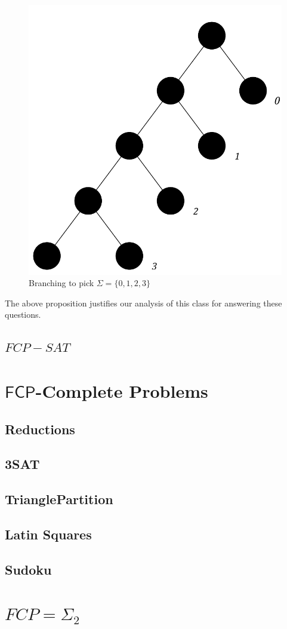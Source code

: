 \documentclass[runningheads,a4paper]{llncs}
\begin{document}
\begin{figure}
\centering
\label{fig:branching}
\includegraphics[width=0.4\linewidth]{branching.pdf}
\caption{Branching to pick $\Sigma = \{ 0, 1, 2, 3 \}$}
\end{figure}

The above proposition justifies our analysis of this class for answering these questions.

\subsection{$FCP-SAT$}

\section{$\mathsf{FCP}$-Complete Problems}

\subsection{Reductions}

\subsection{3SAT}

\subsection{TrianglePartition}

\subsection{Latin Squares}

\subsection{Sudoku}

\section{$FCP = \Sigma_2$}
\end{document}
